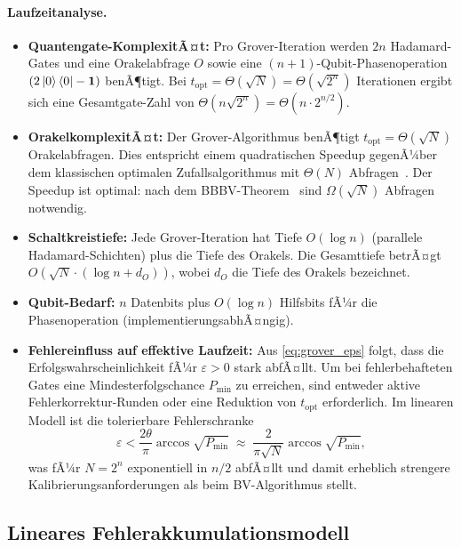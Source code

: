 ﻿\documentclass[11pt,a4paper]{article}
\theoremstyle{definition}
\newcommand{\eps}{\varepsilon}
\begin{document}
\paragraph{Laufzeitanalyse.}
\begin{itemize}[leftmargin=*]
  \item \textbf{Quantengate-KomplexitÃ¤t:} Pro Grover-Iteration werden
    $2n$ Hadamard-Gates und eine Orakelabfrage $O$ sowie eine
    $(n{+}1)$-Qubit-Phasenoperation $(2\ket{0}\bra{0}-\mathbf{1})$
    benÃ¶tigt.  Bei $t_{\mathrm{opt}}=\Theta(\sqrt{N})=\Theta(\sqrt{2^n})$
    Iterationen ergibt sich eine Gesamtgate-Zahl von
    $\Theta(n\sqrt{2^n})=\Theta(n\cdot 2^{n/2})$.
  \item \textbf{OrakelkomplexitÃ¤t:} Der Grover-Algorithmus benÃ¶tigt
    $t_{\mathrm{opt}} = \Theta(\sqrt{N})$ Orakelabfragen.  Dies entspricht
    einem quadratischen Speedup gegenÃ¼ber dem klassischen optimalen
    Zufallsalgorithmus mit $\Theta(N)$ Abfragen~\cite{Grover1996}.
    Der Speedup ist optimal: nach dem BBBV-Theorem~\cite{Nielsen2000}
    sind $\Omega(\sqrt{N})$ Abfragen notwendig.
  \item \textbf{Schaltkreistiefe:} Jede Grover-Iteration hat Tiefe
    $O(\log n)$ (parallele Hadamard-Schichten) plus die Tiefe des
    Orakels.  Die Gesamttiefe betrÃ¤gt $O(\sqrt{N}\cdot(\log n + d_O))$,
    wobei $d_O$ die Tiefe des Orakels bezeichnet.
  \item \textbf{Qubit-Bedarf:} $n$ Datenbits plus $O(\log n)$ Hilfsbits
    fÃ¼r die Phasenoperation (implementierungsabhÃ¤ngig).
  \item \textbf{Fehlereinfluss auf effektive Laufzeit:}
    Aus \eqref{eq:grover_eps} folgt, dass die Erfolgswahrscheinlichkeit
    fÃ¼r $\eps>0$ stark abfÃ¤llt.  Um bei fehlerbehafteten Gates eine
    Mindesterfolgschance $P_{\min}$ zu erreichen, sind entweder
    aktive Fehlerkorrektur-Runden oder eine Reduktion von $t_{\mathrm{opt}}$
    erforderlich.  Im linearen Modell ist die tolerierbare Fehlerschranke
    \[
      \eps < \frac{2\theta}{\pi}\arccos\!\sqrt{P_{\min}}
      \;\approx\; \frac{2}{\pi\sqrt{N}}\arccos\!\sqrt{P_{\min}},
    \]
    was fÃ¼r $N=2^n$ exponentiell in $n/2$ abfÃ¤llt und damit erheblich
    strengere Kalibrierungsanforderungen als beim BV-Algorithmus stellt.
\end{itemize}

\subsection{Lineares Fehlerakkumulationsmodell}
\label{subsec:grover_error}
\end{document}
